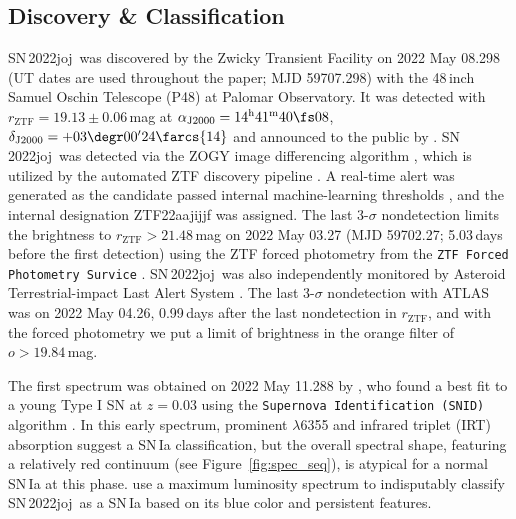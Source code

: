\documentclass[twocolumn]{aastex631}
\newcommand{\sn}{SN\,2022joj}
\newcommand{\adam}[1]{\textcolor{orange}{[AAM: #1]}}
\newcommand{\chang}[1]{\textcolor{blue}{[Chang: #1]}}
\begin{document}
\begin{CJK*}{UTF8}{gbsn}
\subsection{Discovery \& Classification}
\sn\ was discovered by the Zwicky Transient Facility \citep[ZTF;][]{Bellm_ZTF_2019a,Graham_ZTF_2019,Dekany_ZTF_2020} on 2022 May 08.298 (UT dates are used throughout the paper; MJD 59707.298) with the 48\,inch Samuel Oschin Telescope (P48) at Palomar Observatory. It was detected with $r_\mathrm{ZTF}=19.13\pm0.06$\,mag at $\alpha_\mathrm{J2000}=14^\mathrm{h}41^\mathrm{m}40\fs08$, $\delta_\mathrm{J2000}=+03\degr00'24\farcs{14}$ and announced to the public by \citet{Fremling_2022TNSTR}. \sn\ was detected via the ZOGY image differencing algorithm \citep{Zackay_imagesub_2016}, which is utilized by the automated ZTF discovery pipeline \citep{Masci_ZTF_2019}. A real-time alert \citep{Patterson_ZTFalert_2019} was generated as the candidate passed internal machine-learning thresholds \citep[e.g.,][]{Duev_ZTFML_2019,Mahabal_ZTFML_2019}, and the internal designation ZTF22aajijjf was assigned. The last 3-$\sigma$ nondetection limits the brightness to $r_\mathrm{ZTF}>21.48$\,mag on 2022 May 03.27 (MJD 59702.27; 5.03\,days before the first detection) using the ZTF forced photometry from the \texttt{ZTF Forced Photometry Survice} \citep[\texttt{ZFPS};][]{Masci_ZTFforced_2023}. \sn\ was also independently monitored by Asteroid Terrestrial-impact Last Alert System \citep[ATLAS;][]{ATLAS_2018}. The last 3-$\sigma$ nondetection with ATLAS was on 2022 May 04.26, 0.99\,days after the last nondetection in $r_\mathrm{ZTF}$, and with the forced photometry we put a limit of brightness in the orange filter of $o>19.84$\,mag. %

The first spectrum was obtained on 2022 May 11.288 by \citet{Newsome_2022TNSCR}, who found a best fit to a young Type I SN at $z=0.03$ using the \texttt{Supernova Identification (SNID)} algorithm \citep{Blondin_SNID_2007}. In this early spectrum, prominent  $\lambda$6355 and  infrared triplet (IRT) absorption suggest a SN\,Ia classification, but the overall spectral shape, featuring a relatively red continuum (see Figure~\ref{fig:spec_seq}), is atypical for a normal SN\,Ia at this phase. \citet{Chu_2022TNSCR} use a maximum luminosity spectrum to indisputably classify \sn\ as a SN\,Ia based on its blue color and persistent  features.


\end{CJK*}
\end{document}

